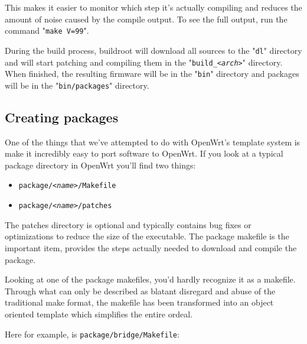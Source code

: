 This makes it easier to monitor which step it's actually compiling and reduces the amount
of noise caused by the compile output. To see the full output, run the command 
"\texttt{make V=99}".

During the build process, buildroot will download all sources to the "\texttt{dl}" 
directory and will start patching and compiling them in the "\texttt{build\_\textit{<arch>}}"
directory. When finished, the resulting firmware will be in the "\texttt{bin}" directory
and packages will be in the "\texttt{bin/packages}" directory.


\subsection{Creating packages}


One of the things that we've attempted to do with OpenWrt's template system is make it
incredibly easy to port software to OpenWrt. If you look at a typical package directory
in OpenWrt you'll find two things:

\begin{itemize}
	\item \texttt{package/\textit{<name>}/Makefile}
	\item \texttt{package/\textit{<name>}/patches}
\end{itemize}

The patches directory is optional and typically contains bug fixes or optimizations to
reduce the size of the executable. The package makefile is the important item, provides
the steps actually needed to download and compile the package.

Looking at one of the package makefiles, you'd hardly recognize it as a makefile.
Through what can only be described as blatant disregard and abuse of the traditional
make format, the makefile has been transformed into an object oriented template which
simplifies the entire ordeal.

Here for example, is \texttt{package/bridge/Makefile}:

